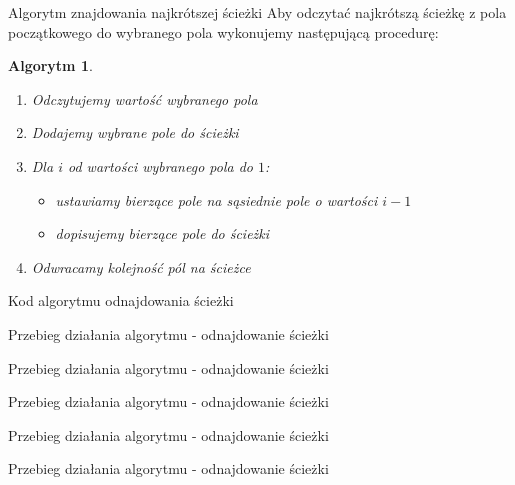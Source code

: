 \documentclass[a4paper,10pt]{beamer}
\newtheorem{alg}{Algorytm}[subsection]
\begin{document}
		\begin{frame}{Algorytm znajdowania najkrótszej ścieżki}
			Aby odczytać najkrótszą ścieżkę z pola początkowego do wybranego pola wykonujemy następującą procedurę:
			\begin{alg}
				\begin{enumerate}
					\item Odczytujemy wartość wybranego pola
					\item Dodajemy wybrane pole do ścieżki
					\item Dla $i$ od wartości wybranego pola do $1$:
					\begin{itemize}
						\item ustawiamy bierzące pole na sąsiednie pole o wartości $i-1$
						\item dopisujemy bierzące pole do ścieżki
					\end{itemize}
					\item Odwracamy kolejność pól na ścieżce
				\end{enumerate}
			\end{alg}
		\end{frame}
		\begin{frame}{Kod algorytmu odnajdowania ścieżki}
		\end{frame}
		\begin{frame}{Przebieg działania algorytmu - odnajdowanie ścieżki}
		\end{frame}
		\begin{frame}{Przebieg działania algorytmu - odnajdowanie ścieżki}
		\end{frame}
		\begin{frame}{Przebieg działania algorytmu - odnajdowanie ścieżki}
		\end{frame}
		\begin{frame}{Przebieg działania algorytmu - odnajdowanie ścieżki}
		\end{frame}
		\begin{frame}{Przebieg działania algorytmu - odnajdowanie ścieżki}
		\end{frame}
\end{document}
